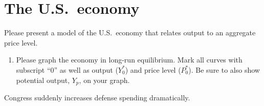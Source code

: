 \documentclass{assignment}
\begin{document}
\section{The U.S.~economy}

Please present a model of the U.S.~economy that relates output to an aggregate price level.

\begin{enumerate}

\item Please graph the economy in long-run equilibrium. Mark all curves with subscript ``0'' as well as output ($Y^*_0$) and price level ($P^*_0$). Be sure to also show potential output, $Y_p$, on your graph.

\begin{solution}


\end{solution}

\end{enumerate}

Congress suddenly increases defense spending dramatically.
\end{document}

